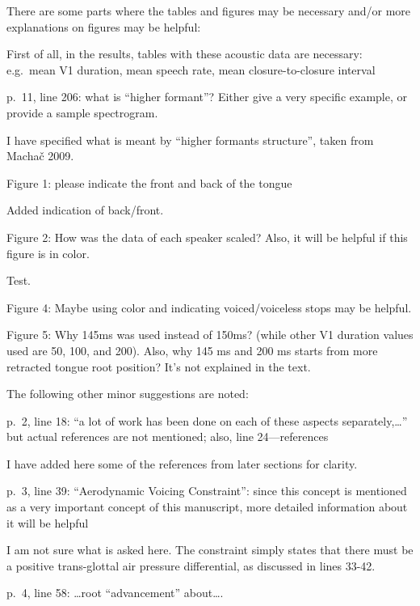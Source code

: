 \documentclass[]{article}
\begin{document}
There are some parts where the tables and figures may be necessary
and/or more explanations on figures may be helpful:

First of all, in the results, tables with these acoustic data are
necessary: e.g.~mean V1 duration, mean speech rate, mean
closure-to-closure interval

p.~11, line 206: what is ``higher formant''? Either give a very specific
example, or provide a sample spectrogram.

\color{plum}

I have specified what is meant by ``higher formants structure'', taken
from Machač 2009. \color{black}

Figure 1: please indicate the front and back of the tongue

\color{plum}

Added indication of back/front. \color{black}

Figure 2: How was the data of each speaker scaled? Also, it will be
helpful if this figure is in color.

\color{plum}

Test. \color{black}

Figure 4: Maybe using color and indicating voiced/voiceless stops may be
helpful.

Figure 5: Why 145ms was used instead of 150ms? (while other V1 duration
values used are 50, 100, and 200). Also, why 145 ms and 200 ms starts
from more retracted tongue root position? It's not explained in the
text.

The following other minor suggestions are noted:

p.~2, line 18: ``a lot of work has been done on each of these aspects
separately,\ldots{}'' but actual references are not mentioned; also,
line 24---references

\color{plum}

I have added here some of the references from later sections for
clarity. \color{black}

p.~3, line 39: ``Aerodynamic Voicing Constraint'': since this concept is
mentioned as a very important concept of this manuscript, more detailed
information about it will be helpful

\color{plum}

I am not sure what is asked here. The constraint simply states that
there must be a positive trans-glottal air pressure differential, as
discussed in lines 33-42. \color{black}

p.~4, line 58: \ldots{}root ``advancement'' about\ldots{}.
\end{document}
